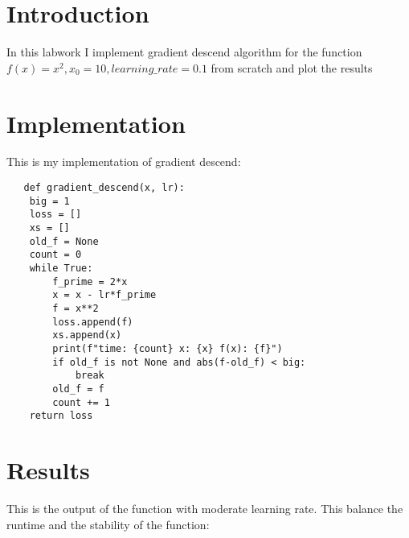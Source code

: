 \documentclass[hidelinks]{report}
\begin{document}
\chapter{Introduction}

\hspace{5mm} In this labwork I implement gradient descend algorithm for the function $f(x) = x^2, 
 x_0 = 10, learning\_rate = 0.1$ from scratch and plot the results

 
\chapter{Implementation}
\noindent This is my implementation of gradient descend:

\begin{verbatim}
   def gradient_descend(x, lr):
    big = 1
    loss = []
    xs = []
    old_f = None
    count = 0
    while True:
        f_prime = 2*x
        x = x - lr*f_prime  
        f = x**2
        loss.append(f)
        xs.append(x)
        print(f"time: {count} x: {x} f(x): {f}")
        if old_f is not None and abs(f-old_f) < big:       
            break
        old_f = f
        count += 1    
    return loss
\end{verbatim}
\chapter{Results}

This is the output of the function with moderate learning rate. This balance the runtime and the stability of the function:
\end{document}
